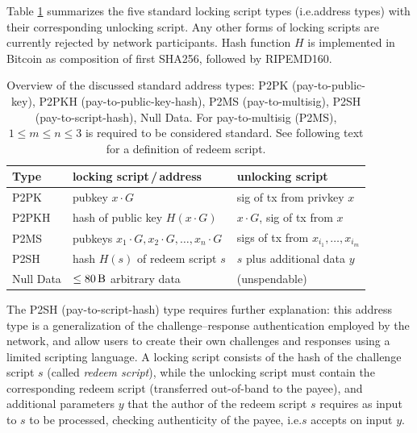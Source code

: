 \documentclass[a4paper,11pt,titlepage]{scrbook}
\begin{document}
Table \ref{table:script-types} summarizes the five standard locking script types (i.e.\@ address types) with their corresponding unlocking script. Any other forms of locking scripts are currently rejected by network participants.
Hash function $H$ is implemented in Bitcoin as composition of first SHA256, followed by RIPEMD160.

\begin{table}
    \renewcommand{\arraystretch}{1.2}
    \centering
    \begin{tabular}{lll}
        \toprule
        \textbf{Type} & \textbf{locking script\,/\,address} & \textbf{unlocking script} \\
        \midrule
        P2PK & pubkey $x\cdot G$ & sig of tx from privkey $x$ \\
        P2PKH & hash of public key $H(x\cdot G)$ & $x\cdot G$, sig of tx from $x$ \\
        P2MS & pubkeys $x_1{\cdot} G, x_2{\cdot} G, \dots, x_n{\cdot} G$ & sigs of tx from $x_{i_1}, \dots, x_{i_m}$ \\
        P2SH & hash $H(s)$ of redeem script $s$ & $s$ plus additional data $y$ \\
        Null Data & $\leq \SI{80}{\byte}$ arbitrary data & (unspendable)\\
        \bottomrule
    \end{tabular}
    \caption[Overview of the discussed standard address types]{Overview of the discussed standard address types: P2PK (pay-to-public-key), P2PKH (pay-to-public-key-hash), P2MS (pay-to-multisig), P2SH (pay-to-script-hash), Null Data. For pay-to-multisig (P2MS), $1\leq m\leq n\leq 3$ is required to be considered standard. See following text for a definition of redeem script.}
    \label{table:script-types}
\end{table}

The P2SH (pay-to-script-hash) type requires further explanation: this address type is a generalization of the challenge–response authentication employed by the network, and allow users to create their own challenges and responses using a limited scripting language.
A locking script consists of the hash of the challenge script $s$ (called \emph{redeem script}), while the unlocking script must contain the corresponding redeem script (transferred out-of-band to the payee), and additional parameters $y$ that the author of the redeem script $s$ requires as input to $s$ to be processed, checking authenticity of the payee, i.e.\@ $s$ accepts on input $y$.
\end{document}
